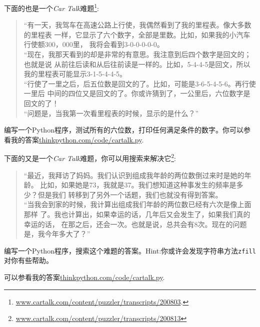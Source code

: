 \begin{ex}
下面的也是一个{\em Car Talk}难题\footnote{\url{www.cartalk.com/content/puzzler/transcripts/200803}.}:



\begin{quote}
“有一天，我驾车在高速公路上行使，我偶然看到了我的里程表。像大多数的里程表
一样，它显示了六个数字，全部是里数。比如，如果我的小汽车行使额300，000里，
我将会看到3-0-0-0-0-0。\\

“现在，我那天看到的却是非常的有意思。我注意到后四个数字是回文的；也就是说
从前往后读和从后往前读是一样的。比如，5-4-4-5是回文，所以我的里程表可能显示3-1-5-4-4-5。\\

“行使了一里之后，后五位数是回文的了。比如，可能是3-6-5-4-5-6。再行使一里后
中间的四位又是回文的了。你或许猜到了，一公里后，六位数字是回文的了！\\

“问题是，当我第一次看里程表的时候，显示的是什么？”
\end{quote}

编写一个Python程序，测试所有的六位数，打印任何满足条件的数字。你可以参看我的答案\url{thinkpython.com/code/cartalk.py}.

\end{ex}

\begin{ex}

下面的又是一个{\em Car Talk}难题，你可以用搜索来解决它\footnote{\url{www.cartalk.com/content/puzzler/transcripts/200813}}:


\begin{quote}
“最近，我拜访了妈妈。我们认识到组成我年龄的两位数倒过来时是她的年龄。
比如，如果她是73，我就是37。我们想知道这种事发生的频率是多少？但是我们
转移到了另外一个话题，我们也就没有得到答案。\\

“当我会到家的时候，我计算出组成我们年龄的两位数已经有六次是像上面那样
了。我也计算出，如果幸运的话，几年后又会发生了，如果我们真的幸运的话，
在那之后，还会一次。也就是说，总共会有8次。现在的问题是，我今年多大了？”

\end{quote}

编写一个Python程序，搜索这个难题的答案。Hint:你或许会发现字符串方法{\tt zfill}对你有些帮助。

可以参看我的答案\url{thinkpython.com/code/cartalk.py}.

\end{ex}





























